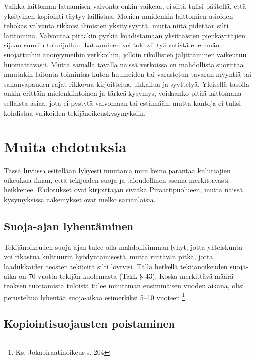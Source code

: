 \documentclass[titlepage,12pt]{article}
\begin{document}
Vaikka laittoman lataamisen valvonta onkin vaikeaa, ei siitä tulisi
päätellä, että yksityinen kopiointi täytyy laillistaa.  Monien
muidenkin laittomien asioiden tehokas valvonta rikkoisi ihmisten
yksityisyyttä, mutta niitä pidetään silti laittomina.  Valvontaa
pitääkin pyrkiä kohdistamaan yksittäisten pienkäyttäjien sijaan
suuriin toimijoihin.  Lataaminen voi toki siirtyä entistä enemmän
suojattuihin anonyymeihin verkkoihin, jolloin rikollisten
jäljittäminen vaikeutuu huomattavasti.  Mutta samalla tavalla näissä
verkoissa on mahdollista suorittaa muutakin laitonta toimintaa kuten
huumeiden tai varastetun tavaran myyntiä tai sananvapauden rajat
rikkovaa kirjoittelua, uhkailua ja syyttelyä.  Yleisellä tasolla onkin
erittäin mielenkiintoinen ja tärkeä kysymys, voidaanko pitää
laittomana sellaista asiaa, jota ei pystytä valvomaan tai estämään,
mutta kantoja ei tulisi kohdistaa valikoiden tekijänoikeuskysymyksiin.


\section{Muita ehdotuksia}

Tässä luvussa esitellään lyhyesti muutama muu keino parantaa
kuluttajien oikeuksia ilman, että tekijöiden suoja ja taloudellinen
asema merkittävästi heikkenee.  Ehdotukset ovat kirjoittajan eivätkä
Piraattipuolueen, mutta näissä kysymyksissä näkemykset ovat melko
samanlaisia.

\subsection{Suoja-ajan lyhentäminen}

Tekijänoikeuden suoja-ajan tulee olla mahdollisimman lyhyt, jotta
yhteiskunta voi rikastua kulttuurin hyödyntämisestä, mutta riittävän
pitkä, jotta laadukkaiden teosten tekijöitä silti löytyisi.  Tällä
hetkellä tekijänoikeuden suoja-aika on 70 vuotta tekijän kuolemasta
(TekL § 43).  Koska merkittävä määrä teoksen tuottamista tuloista
tulee muutaman ensimmäisen vuoden aikana, olisi perusteltua lyhentää
suoja-aikaa esimerkiksi 5--10 vuoteen.\footnote{Ks. Jokapiraatinoikeus
  s. 204}


\subsection{Kopiointisuojausten poistaminen}
\end{document}
